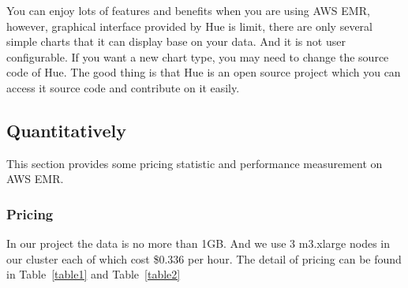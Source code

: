 You can enjoy lots of features and benefits when you are using AWS EMR, however, graphical interface provided by Hue is limit, there are only several simple charts that it can display base on your data. And it is not user configurable. If you want a new chart type, you may need to change the source code of Hue. The good thing is that Hue is an open source project which you can access it source code and contribute on it easily.

\subsection{Quantitatively}
This section provides some pricing statistic and performance measurement on AWS EMR. 

\subsubsection*{Pricing}
In our project the data is no more than 1GB. And we use 3 m3.xlarge nodes in our cluster each of which cost \$0.336 per hour.
The detail of pricing can be found in Table~\ref{table1} and Table~\ref{table2}

